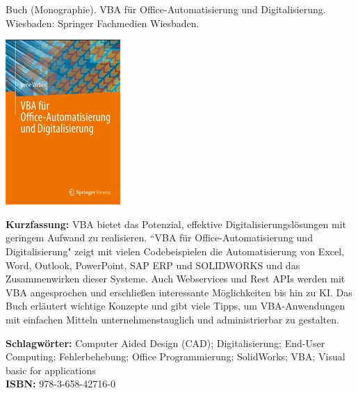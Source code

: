 {
Buch (Monographie). VBA für Office-Automatisierung und Digitalisierung.
Wiesbaden: Springer Fachmedien Wiesbaden.
 \\
\begin{minipage}{0.38\textwidth}
	\includegraphics[width=\linewidth]{images/Weber.jpg}
\end{minipage}
\hfill
\begin{minipage}{0.6\textwidth}
\textbf{Kurzfassung:}
VBA bietet das Potenzial, effektive Digitalisierungslösungen mit geringem Aufwand zu realisieren. “VBA für Office-Automatisierung und Digitalisierung" zeigt mit vielen Codebeispielen die Automatisierung von Excel, Word, Outlook, PowerPoint, SAP ERP und SOLIDWORKS und das Zusammenwirken dieser Systeme. Auch Webservices und Rest APIs werden mit VBA angesprochen und erschließen interessante Möglichkeiten bis hin zu KI. Das Buch erläutert wichtige Konzepte und gibt viele Tipps, um VBA-Anwendungen mit einfachen Mitteln unternehmenstauglich und administrierbar zu gestalten.
\end{minipage}
\textbf{Schlagwörter:}
Computer Aided Design (CAD); Digitalisierung; End-User Computing; Fehlerbehebung; Office Programmierung; SolidWorks; VBA; Visual basic for applications
\\ \textbf{ISBN:}
978-3-658-42716-0
}